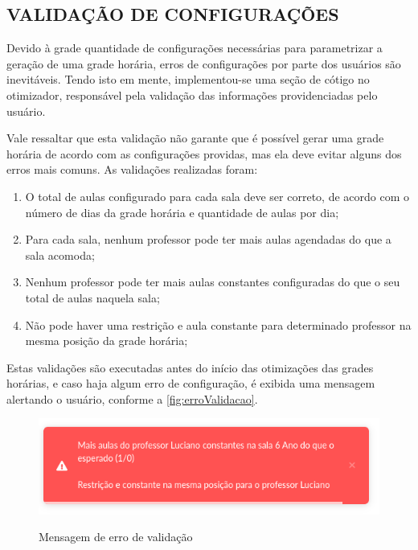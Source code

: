 \subsection{VALIDAÇÃO DE CONFIGURAÇÕES}

Devido à grade quantidade de configurações necessárias para parametrizar a geração de uma grade horária, erros de configurações por parte dos usuários são inevitáveis. Tendo isto em mente, implementou-se uma seção de cótigo no otimizador, responsável pela validação das informações providenciadas pelo usuário.

Vale ressaltar que esta validação não garante que é possível gerar uma grade horária de acordo com as configurações providas, mas ela deve evitar alguns dos erros mais comuns. As validações realizadas foram:

\begin{enumerate}
	\item O total de aulas configurado para cada sala deve ser correto, de acordo com o número de dias da grade horária e quantidade de aulas por dia;
	\item Para cada sala, nenhum professor pode ter mais aulas agendadas do que a sala acomoda;
	\item Nenhum professor pode ter mais aulas constantes configuradas do que o seu total de aulas naquela sala;
	\item Não pode haver uma restrição e aula constante para determinado professor na mesma posição da grade horária;
\end{enumerate}

Estas validações são executadas antes do início das otimizações das grades horárias, e caso haja algum erro de configuração, é exibida uma mensagem alertando o usuário, conforme a \autoref{fig:erroValidacao}.

\begin{figure}[!htb]
	\centering
	\caption{Mensagem de erro de validação}
	\includegraphics[width=1\textwidth]{./dados/figuras/erroValidacao}
	\label{fig:erroValidacao}
\end{figure}
\pagebreak
